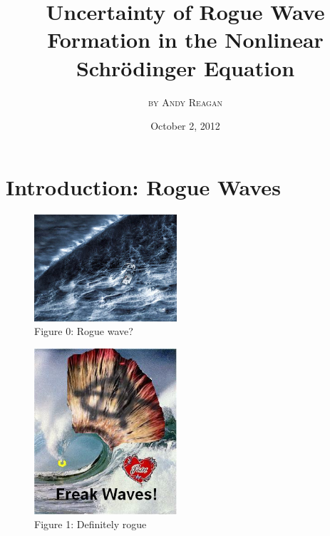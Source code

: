\documentclass{beamer}
\theoremstyle{plain}
\theoremstyle{definition}
\begin{document}
\title{\textbf{Uncertainty of Rogue Wave Formation in the Nonlinear Schr\"{o}dinger Equation}}
\author{\textsc{by Andy Reagan}}
\date{October 2, 2012}


\frame{\maketitle}



\section[Outline]{}
\frame{\tableofcontents}

\section{Introduction: Rogue Waves}

\frame
{
\begin{figure}
\begin{center}
\includegraphics[width=200px]{perfect-storm.jpeg}\\
Figure 0: Rogue wave?
\end{center}
\end{figure}
\vspace{-1mm}
}

\frame
{
\begin{figure}
\begin{center}
\includegraphics[width=200px]{reardon.JPG}\\
Figure 1: Definitely rogue
\end{center}
\end{figure}
\vspace{-1mm}
}
\end{document}
